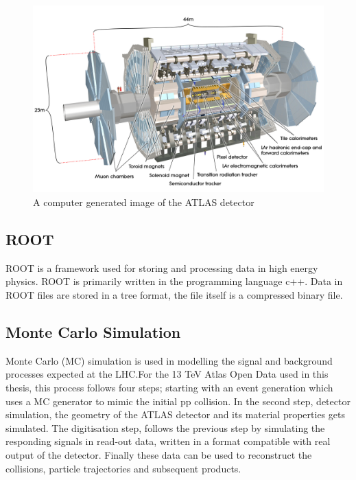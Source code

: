 \documentclass[12pt,a4paper]{article}
\numberwithin{equation}{section}
\begin{document}
\begin{figure}[H]
	\centering
	\includegraphics[scale=0.1]{figures/atlas.jpg}
	\caption{A computer generated image of the ATLAS detector~\cite{detector}}\label{fig:detector}
\end{figure}

\subsection{ROOT}
ROOT is a framework used for storing and processing data in high energy physics. ROOT is primarily written in the programming language c++. Data in ROOT files are stored in a tree format, the file itself is a compressed binary file. 

\subsection{Monte Carlo Simulation}
Monte Carlo (MC) simulation is used in modelling the signal and background
processes expected at the LHC.\@ For the 13 TeV Atlas Open Data used in this
thesis, this process follows four steps; starting with an event generation which
uses a MC generator to mimic the initial pp collision. In the second step,
detector simulation, the geometry of the ATLAS detector and its material
properties gets simulated. The digitisation step, follows the previous step by
simulating the responding signals in read-out data, written in a format
compatible with real output of the detector. Finally these data can be
used to reconstruct the collisions, particle trajectories and subsequent
products.\\
\end{document}
